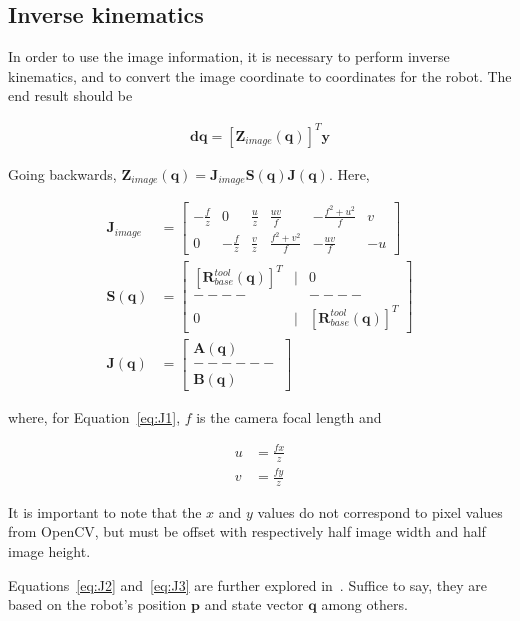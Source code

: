 \subsection{Inverse kinematics}
In order to use the image information, it is necessary to perform inverse kinematics, and to convert the image coordinate to coordinates for the robot.
The end result should be

\begin{align}
\mathrm{\textbf{dq}}=\left[\textbf{Z}_\mathit{image}(\textbf{q})\right]^T\textbf{y} %
\end{align}

Going backwards, $\textbf{Z}_\mathit{image}(\textbf{q}) = \textbf{J}_\mathit{image}\textbf{S}(\textbf{q})\textbf{J}(\textbf{q})$. Here,

\begin{align}
    \textbf{J}_\mathit{image}&=
    \left[
        \begin{matrix}
            -\frac{f}{z} & 0            & \frac{u}{z} & \frac{uv}{f}      & -\frac{f^2+u^2}{f} & v \\
            0            & -\frac{f}{z} & \frac{v}{z} & \frac{f^2+v^2}{f} & -\frac{uv}{f}      & -u
        \end{matrix}
    \right]\label{eq:J1}\\
    \textbf{S}(\textbf{q})&=\left[
    \begin{matrix}
        \left[\textbf{R}_\mathit{base}^\mathit{tool}(\textbf{q})\right]^T & | & 0 \\ %
        -- -- & & -- -- \\
        0 & | & \left[\textbf{R}_\mathit{base}^\mathit{tool}(\textbf{q})\right]^T %
    \end{matrix}
    \right]\label{eq:J2}\\
    \textbf{J}(\textbf{q})&=\left[
    \begin{matrix}
        \textbf{A}(\textbf{q})\\
        ------\\
        \textbf{B}(\textbf{q})
    \end{matrix}
    \right]\label{eq:J3}
\end{align}

where, for Equation~\ref{eq:J1}, $f$ is the camera focal length and

\begin{align}
u &= \frac{fx}{z}\nonumber \\
v &= \frac{fy}{z}
\end{align}

It is important to note that the $x$ and $y$ values do not correspond to pixel values from OpenCV, but must be offset with respectively half image width and half image height.

Equations~\ref{eq:J2} and~\ref{eq:J3} are further explored in~\cite{robbook}.
Suffice to say, they are based on the robot's position $\textbf{p}$ and state vector $\textbf{q}$ among others.
